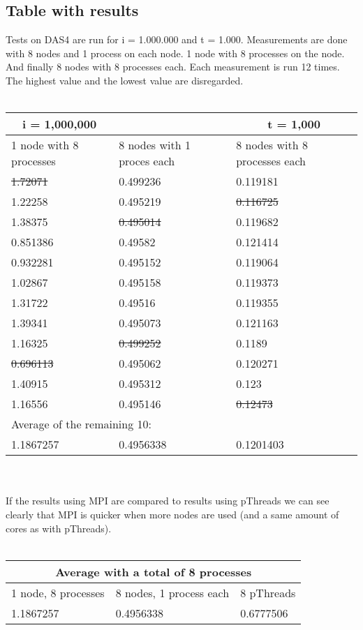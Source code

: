 \documentclass[a4paper]{article}
\begin{document}
  \subsection{Table with results}
    Tests on DAS4 are run for i = 1.000.000 and t = 1.000.
    Measurements are done with 8 nodes and 1 process on each node. 1 node with
    8 processes on the node. And finally 8 nodes with 8 processes each.
    Each measurement is run 12 times. 
    The highest value and the lowest value are disregarded. \\\\
    \begin{tabular}{| p{} | p{} | p{} |}
      \hline
      \multicolumn{1}{|c}{i = 1,000,000} & \multicolumn{1}{c}{} & \multicolumn{1}{c|}{t = 1,000}\\
      \hline
      1 node with 8 processes & 8 nodes with 1 proces each & 8 nodes with 8 processes each\\
      \hline
      \st{1.72071} & 0.499236 & 0.119181\\
      \hline
      1.22258 & 0.495219 & \st{0.116725}\\
      \hline
      1.38375 & \st{0.495014} & 0.119682\\
      \hline
      0.851386 & 0.49582 & 0.121414\\
      \hline
      0.932281 & 0.495152 & 0.119064\\
      \hline
      1.02867 & 0.495158 & 0.119373\\
      \hline
      1.31722 & 0.49516 & 0.119355\\
      \hline
      1.39341 & 0.495073 & 0.121163\\
      \hline
      1.16325 & \st{0.499252} & 0.1189\\
      \hline
      \st{0.696113} & 0.495062 & 0.120271\\
      \hline
      1.40915 & 0.495312 & 0.123\\
      \hline
      1.16556 & 0.495146 & \st{0.12473}\\
      \hline
      \multicolumn{3}{|l|}{Average of the remaining 10:}\\
      \hline
      1.1867257 & 0.4956338 & 0.1201403\\
      \hline
    \end{tabular}\\\\
    If the results using MPI are compared to results using pThreads we can see
    clearly that MPI is quicker when more nodes are used (and a same amount
    of cores as with pThreads).\\\\
    \begin{tabular}{| p{} | p{} | p{} |}
      \hline
      \multicolumn{3}{|c|}{Average with a total of 8 processes}\\
      \hline
      1 node, 8 processes & 8 nodes, 1 process each & 8 pThreads \\
      \hline
      1.1867257 & 0.4956338 & 0.6777506\\
      \hline
    \end{tabular}
    
    
    
\end{document}

